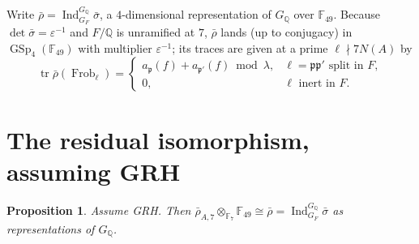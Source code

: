 \documentclass[11pt]{article}
\newtheorem{proposition}{Proposition}
\theoremstyle{definition}
\DeclareMathOperator{\GSp}{GSp}
\DeclareMathOperator{\Ind}{Ind}
\DeclareMathOperator{\tr}{tr}
\DeclareMathOperator{\Frob}{Frob}
\newcommand{\Q}{\mathbb{Q}}
\newcommand{\F}{\mathbb{F}}
\newcommand{\GQ}{G_{\Q}}
\newcommand{\GF}{G_F}
\newcommand{\fp}{\mathfrak{p}}
\newcommand{\lam}{\lambda}
\newcommand{\rbar}{\bar\rho}
\newcommand{\sbar}{\bar\sigma}
\newcommand{\eps}{\varepsilon}
\begin{document}
Write $\rbar=\Ind_{\GF}^{\GQ}\sbar$, a $4$-dimensional representation of $\GQ$ over
$\F_{49}$. Because $\det\sbar=\eps^{-1}$ and $F/\Q$ is unramified at $7$, $\rbar$
lands (up to conjugacy) in $\GSp_4(\F_{49})$ with multiplier $\eps^{-1}$; its
traces are given at a prime $\ell\nmid 7 N(A)$ by
\begin{equation}\label{eq:indtrace}
  \tr\rbar(\Frob_\ell)=
  \begin{cases}
     a_{\fp}(f)+a_{\fp'}(f)\bmod\lam, & \ell=\fp\fp' \text{ split in }F,\\[2pt]
     0, & \ell \text{ inert in }F .
  \end{cases}
\end{equation}

\section{The residual isomorphism, assuming GRH}\label{step:resiso}\label{sec:resiso}

\begin{proposition}\label{prop:resiso}
Assume GRH. Then $\rbar_{A,7}\otimes_{\F_7}\F_{49}\cong \rbar=\Ind_{\GF}^{\GQ}\sbar$
as representations of $\GQ$.
\end{proposition}
\end{document}
